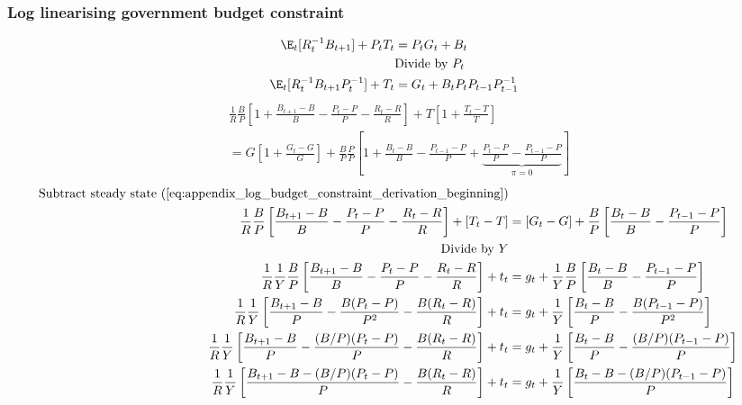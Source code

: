 \subsubsection{Log linearising government budget constraint}
\begin{align} \label{eq:appendix_log_budget_constraint_derivation_beginning}
    \E_t [R^{-1}_tB_{t+1}] + P_t T_t &= P_tG_t + B_t\\
    &\text{Divide by $P_t$} \nonumber\\
    \E_t [R^{-1}_tB_{t+1}P_t^{-1}] + T_t &= G_t + B_tP_t P_{t-1} P^{-1}_{t-1}
\end{align} 
\begin{align}   
    &\frac{1}{R}\frac{B}{P}\left[ 1 + \frac{B_{t+1}-B}{B} - \frac{P_t - P}{P} - \frac{R_t-R}{R}\right] + T\left[ 1 + \frac{T_t - T}{T} \right] \nonumber \\ 
    &= G\left[ 1 + \frac{G_t - G}{G} \right] + \frac{B}{P} \frac{P}{P} \left[ 1 + \frac{B_t - B}{B} - \frac{P_{t-1} - P}{P} + \underbrace{\frac{P_{t} - P}{P} - \frac{P_{t-1} - P}{P}}_{\pi = 0}\right]
\end{align}
\begin{align}
    \text{Subtract steady state (\ref{eq:appendix_log_budget_constraint_derivation_beginning})}\nonumber \\
    \frac{1}{R}\frac{B}{P}\left[\frac{B_{t+1}-B}{B} - \frac{P_t - P}{P} - \frac{R_t-R}{R}\right] + \left[T_t - T \right] &= \left[G_t - G \right] + \frac{B}{P} \left[\frac{B_t - B}{B} - \frac{P_{t-1} - P}{P}\right]\\
    \text{Divide by $Y$} \nonumber\\
    \frac{1}{R}\frac{1}{Y}\frac{B}{P}\left[\frac{B_{t+1}-B}{B} - \frac{P_t - P}{P} - \frac{R_t-R}{R}\right] + t_t &= g_t + \frac{1}{Y}\frac{B}{P} \left[\frac{B_t - B}{B} - \frac{P_{t-1} - P}{P}\right]\\
    \frac{1}{R}\frac{1}{Y}\left[\frac{B_{t+1}-B}{P} - \frac{B(P_t - P)}{P^{2}} - \frac{B(R_t-R)}{R}\right] + t_t &= g_t + \frac{1}{Y} \left[\frac{B_t-B}{P} - \frac{B(P_{t-1} - P)}{P^{2}}\right]\\
    \frac{1}{R}\frac{1}{Y}\left[\frac{B_{t+1}-B}{P} - \frac{(B/P)(P_t - P)}{P} - \frac{B(R_t-R)}{R}\right] + t_t &= g_t + \frac{1}{Y} \left[\frac{B_t-B}{P} - \frac{(B/P)(P_{t-1} - P)}{P}\right]\\
    \frac{1}{R}\frac{1}{Y}\left[\frac{B_{t+1}-B - (B/P)(P_t - P)}{P} - \frac{B(R_t-R)}{R}\right] + t_t &= g_t + \frac{1}{Y} \left[\frac{B_{t}-B - (B/P)(P_{t-1} - P)}{P}\right]
\end{align}
